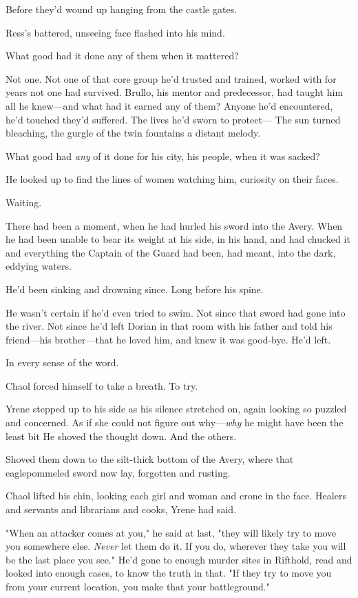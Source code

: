 Before they'd wound up hanging from the castle gates.

Ress's battered, unseeing face flashed into his mind.

What good had it done any of them when it mattered?

Not one. Not one of that core group he'd trusted and trained, worked with for years  not one had survived. Brullo, his mentor and predecessor, had taught him all he knew---and what had it earned any of them? Anyone he'd encountered, he'd touched  they'd suffered. The lives he'd sworn to protect--- The sun turned bleaching, the gurgle of the twin fountains a distant melody.

What good had \emph{any} of it done for his city, his people, when it was sacked?

He looked up to find the lines of women watching him, curiosity on their faces.

Waiting.

There had been a moment, when he had hurled his sword into the Avery. When he had been unable to bear its weight at his side, in his hand, and had chucked it and everything the Captain of the Guard had been, had meant, into the dark, eddying waters.

He'd been sinking and drowning since. Long before his spine.

He wasn't certain if he'd even tried to swim. Not since that sword had gone into the river. Not since he'd left Dorian in that room with his father and told his friend---his brother---that he loved him, and knew it was good-bye. He'd  left.

In every sense of the word.

Chaol forced himself to take a breath. To try.

Yrene stepped up to his side as his silence stretched on, again looking so puzzled and concerned. As if she could not figure out why---\emph{why} he might have been the least bit  He shoved the thought down. And the others.

Shoved them down to the silt-thick bottom of the Avery, where that eaglepommeled sword now lay, forgotten and rusting.

Chaol lifted his chin, looking each girl and woman and crone in the face. Healers and servants and librarians and cooks, Yrene had said.

"When an attacker comes at you," he said at last, "they will likely try to move you somewhere else. \emph{Never} let them do it. If you do, wherever they take you will be the last place you see." He'd gone to enough murder sites in Rifthold, read and looked into enough cases, to know the truth in that. "If they try to move you from your current location, you make that your battleground."


